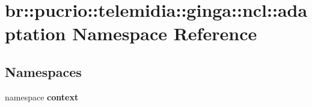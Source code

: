 \section{br::pucrio::telemidia::ginga::ncl::adaptation Namespace Reference}
\label{namespacebr_1_1pucrio_1_1telemidia_1_1ginga_1_1ncl_1_1adaptation}


\subsection*{Namespaces}
\begin{CompactItemize}
\item 
namespace {\bf context}
\end{CompactItemize}
